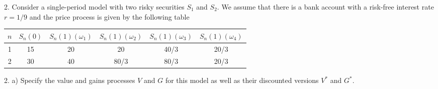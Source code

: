 \documentclass[11pt,a4paper]{article}
\begin{document}
\begin{question}{2.}
  Consider a single-period model with two risky securities $S_1$ and $S_2$. We assume that there is a bank account with a risk-free interest rate $r=1/9$ and the price process is given by the following table
  \begin{center}
    \begin{tabular}{c|c|cccc}
      $n$&$S_n(0)$&$S_n(1)(\omega_1)$&$S_n(1)(\omega_2)$&$S_n(1)(\omega_3)$&$S_n(1)(\omega_4)$\\\hline
      1&15&20&20&40/3&20/3\\
      2&30&40&80/3&80/3&20/3
    \end{tabular}
  \end{center}
\end{question}

\begin{question}{2. a)}
  Specify the value and gains processes $V$ and $G$ for this model as well as their discounted versions $V^*$ and $G^*$.
\end{question}
\end{document}
